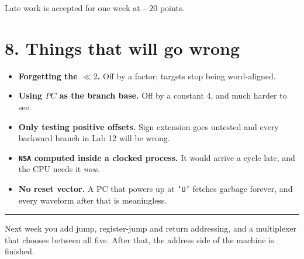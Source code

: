 \documentclass[11pt]{article}
\newcommand{\code}[1]{\texttt{#1}}
\newcommand{\hr}{\vspace{2pt}\hrule\vspace{6pt}}
\begin{document}
Late work is accepted for one week at $-20$ points.

\section*{8. Things that will go wrong}

\begin{itemize}[leftmargin=1.6em,itemsep=1pt]
\item \textbf{Forgetting the $\ll 2$.} Off by a factor; targets stop being
word-aligned.
\item \textbf{Using $PC$ as the branch base.} Off by a constant 4, and much
harder to see.
\item \textbf{Only testing positive offsets.} Sign extension goes untested and
every backward branch in Lab 12 will be wrong.
\item \textbf{\code{NSA} computed inside a clocked process.} It would arrive a
cycle late, and the CPU needs it \emph{now}.
\item \textbf{No reset vector.} A PC that powers up at \code{'U'} fetches
garbage forever, and every waveform after that is meaningless.
\end{itemize}

\vspace{10pt}
\hr
{\small Next week you add jump, register-jump and return addressing, and a
multiplexer that chooses between all five. After that, the address side of the
machine is finished.}
\end{document}
